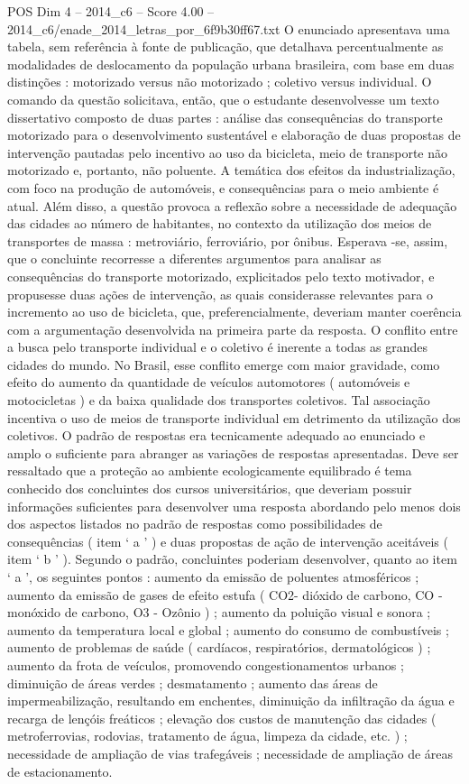\begin{textsample}{POS Dim 4 – 2014\_c6 – Score 4.00 – 2014\_c6/enade\_2014\_letras\_por\_6f9b30ff67.txt}
O enunciado apresentava uma tabela, sem referência à fonte de publicação, que detalhava percentualmente as modalidades de deslocamento da população urbana brasileira, com base em duas distinções : motorizado versus não motorizado ; coletivo versus individual.
O comando da questão solicitava, então, que o estudante desenvolvesse um texto dissertativo composto de duas partes : análise das consequências do transporte motorizado para o desenvolvimento sustentável e elaboração de duas propostas de intervenção pautadas pelo incentivo ao uso da bicicleta, meio de transporte não motorizado e, portanto, não poluente.
A temática dos efeitos da industrialização, com foco na produção de automóveis, e consequências para o meio ambiente é atual.
Além disso, a questão provoca a reflexão sobre a necessidade de adequação das cidades ao número de habitantes, no contexto da utilização dos meios de transportes de massa : metroviário, ferroviário, por ônibus.
Esperava -se, assim, que o concluinte recorresse a diferentes argumentos para analisar as consequências do transporte motorizado, explicitados pelo texto motivador, e propusesse duas ações de intervenção, as quais considerasse relevantes para o incremento ao uso de bicicleta, que, preferencialmente, deveriam manter coerência com a argumentação desenvolvida na primeira parte da resposta.
O conflito entre a busca pelo transporte individual e o coletivo é inerente a todas as grandes cidades do mundo.
No Brasil, esse conflito emerge com maior gravidade, como efeito do aumento da quantidade de veículos automotores ( automóveis e motocicletas ) e da baixa qualidade dos transportes coletivos.
Tal associação incentiva o uso de meios de transporte individual em detrimento da utilização dos coletivos.
O padrão de respostas era tecnicamente adequado ao enunciado e amplo o suficiente para abranger as variações de respostas apresentadas.
Deve ser ressaltado que a proteção ao ambiente ecologicamente equilibrado é tema conhecido dos concluintes dos cursos universitários, que deveriam possuir informações suficientes para desenvolver uma resposta abordando pelo menos dois dos aspectos listados no padrão de respostas como possibilidades de consequências ( item ‘ a ’ ) e duas propostas de ação de intervenção aceitáveis ( item ‘ b ’ ).
Segundo o padrão, concluintes poderiam desenvolver, quanto ao item ‘ a ’, os seguintes pontos : aumento da emissão de poluentes atmosféricos ; aumento da emissão de gases de efeito estufa ( CO2- dióxido de carbono, CO - monóxido de carbono, O3 - Ozônio ) ; aumento da poluição visual e sonora ; aumento da temperatura local e global ; aumento do consumo de combustíveis ; aumento de problemas de saúde ( cardíacos, respiratórios, dermatológicos ) ; aumento da frota de veículos, promovendo congestionamentos urbanos ; diminuição de áreas verdes ; desmatamento ; aumento das áreas de impermeabilização, resultando em enchentes, diminuição da infiltração da água e recarga de lençóis freáticos ; elevação dos custos de manutenção das cidades ( metroferrovias, rodovias, tratamento de água, limpeza da cidade, etc. ) ; necessidade de ampliação de vias trafegáveis ; necessidade de ampliação de áreas de estacionamento.

\end{textsample}
